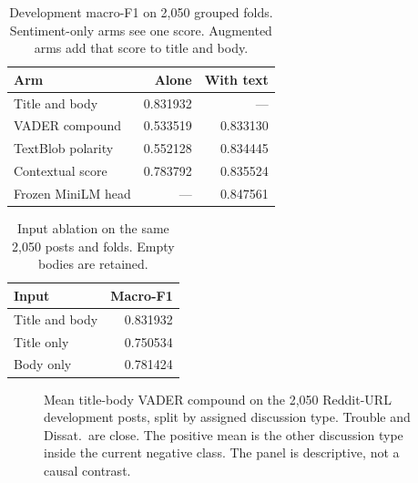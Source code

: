 \documentclass[conference,letterpaper]{IEEEtran}
\begin{document}
\begin{table}[t]
\caption{Development macro-F1 on 2,050 grouped folds. Sentiment-only arms see one score. Augmented arms add that score to title and body.}
\label{tab:sent}
\centering
\footnotesize
\setlength{\tabcolsep}{3pt}
\begin{tabular}{lrr}
\toprule
Arm & Alone & With text \\
\midrule
Title and body & 0.831932 & --- \\
VADER compound & 0.533519 & 0.833130 \\
TextBlob polarity & 0.552128 & 0.834445 \\
Contextual score & 0.783792 & 0.835524 \\
Frozen MiniLM head & --- & 0.847561 \\
\bottomrule
\end{tabular}
\end{table}

\begin{table}[t]
\caption{Input ablation on the same 2,050 posts and folds. Empty bodies are retained.}
\label{tab:ablate}
\centering
\footnotesize
\begin{tabular}{lr}
\toprule
Input & Macro-F1 \\
\midrule
Title and body & 0.831932 \\
Title only & 0.750534 \\
Body only & 0.781424 \\
\bottomrule
\end{tabular}
\end{table}

\begin{figure}[t]
\centering
{}
\caption{Mean title-body VADER compound on the 2,050 Reddit-URL development posts, split by assigned discussion type. Trouble and Dissat.\ are close. The positive mean is the other discussion type inside the current negative class. The panel is descriptive, not a causal contrast.}
\label{fig:valence}
\end{figure}
\end{document}
